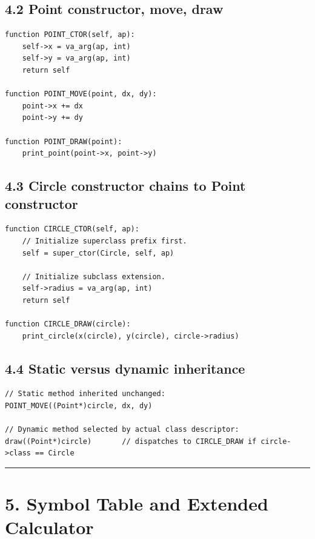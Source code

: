\documentclass[11pt]{article}
\begin{document}
\subsection{4.2 Point constructor, move,
draw}\label{point-constructor-move-draw}

\begin{verbatim}
function POINT_CTOR(self, ap):
    self->x = va_arg(ap, int)
    self->y = va_arg(ap, int)
    return self

function POINT_MOVE(point, dx, dy):
    point->x += dx
    point->y += dy

function POINT_DRAW(point):
    print_point(point->x, point->y)
\end{verbatim}

\subsection{4.3 Circle constructor chains to Point
constructor}\label{circle-constructor-chains-to-point-constructor}

\begin{verbatim}
function CIRCLE_CTOR(self, ap):
    // Initialize superclass prefix first.
    self = super_ctor(Circle, self, ap)

    // Initialize subclass extension.
    self->radius = va_arg(ap, int)
    return self

function CIRCLE_DRAW(circle):
    print_circle(x(circle), y(circle), circle->radius)
\end{verbatim}

\subsection{4.4 Static versus dynamic
inheritance}\label{static-versus-dynamic-inheritance}

\begin{verbatim}
// Static method inherited unchanged:
POINT_MOVE((Point*)circle, dx, dy)

// Dynamic method selected by actual class descriptor:
draw((Point*)circle)       // dispatches to CIRCLE_DRAW if circle->class == Circle
\end{verbatim}

\begin{center}\rule{0.5\linewidth}{0.5pt}\end{center}

\section{5. Symbol Table and Extended
Calculator}\label{symbol-table-and-extended-calculator}
\end{document}
